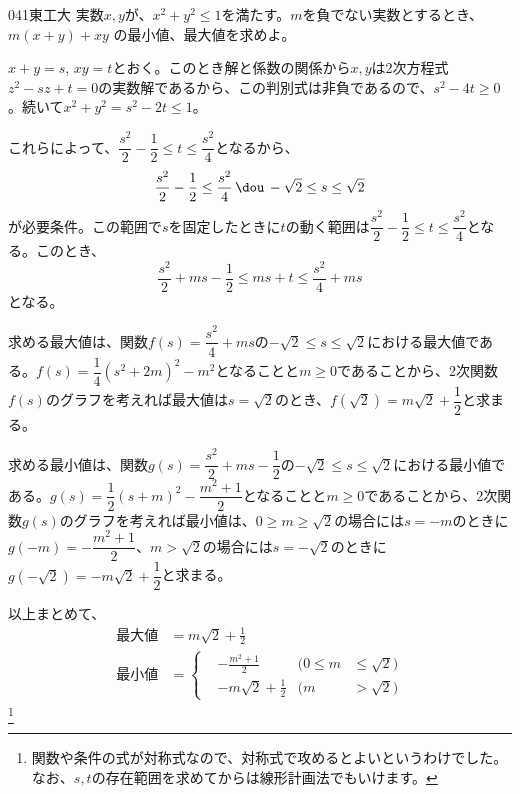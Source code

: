 \begin{thm}{041}{}{東工大}
 実数$x,y$が、$x^2+y^2\le 1$を満たす。$m$を負でない実数とするとき、$m(x+y)+xy$ の最小値、最大値を求めよ。
\end{thm}

$x+y=s$, $xy=t$とおく。このとき解と係数の関係から$x, y$は2次方程式$z^2-sz+t=0$の実数解であるから、この判別式は非負であるので、$s^2-4t\ge 0$。続いて$x^2+y^2=s^2-2t\le 1$。

これらによって、$\dfrac{s^2}{2}-\dfrac{1}{2}\le t\le \dfrac{s^2}{4}$となるから、
\[ \frac{s^2}{2}-\frac{1}{2}\le \frac{s^2}{4} \,\dou\, -\sqrt{2}\le s\le \sqrt{2} \]
が必要条件。この範囲で$s$を固定したときに$t$の動く範囲は$\dfrac{s^2}{2}-\dfrac{1}{2}\le t\le \dfrac{s^2}{4}$となる。このとき、
\[ \frac{s^2}{2}+ms-\frac{1}{2}\le ms+t\le \frac{s^2}{4}+ms \]
となる。

求める最大値は、関数$f(s)=\dfrac{s^2}{4}+ms$の$-\sqrt{2}\le s\le\sqrt{2}$における最大値である。$f(s)=\dfrac{1}{4}(s^2+2m)^2-m^2$となることと$m\ge 0$であることから、2次関数$f(s)$のグラフを考えれば最大値は$s=\sqrt{2}$のとき、$f(\sqrt{2})=m\sqrt{2}+\dfrac{1}{2}$と求まる。

求める最小値は、関数$g(s)=\dfrac{s^2}{2}+ms-\dfrac{1}{2}$の$-\sqrt{2}\le s\le \sqrt{2}$における最小値である。$g(s)=\dfrac{1}{2}(s+m)^2-\dfrac{m^2+1}{2}$となることと$m\ge 0$であることから、2次関数$g(s)$のグラフを考えれば最小値は、$0\ge m\ge\sqrt{2}$の場合には$s=-m$のときに$g(-m)=-\dfrac{m^2+1}{2}$、$m>\sqrt{2}$の場合には$s=-\sqrt{2}$のときに$g(-\sqrt{2})=-m\sqrt{2}+\dfrac{1}{2}$と求まる。

以上まとめて、
\begin{align*}
 \text{最大値}&=m\sqrt{2}+\frac{1}{2} \\
 \text{最小値}&=\left\{
 \begin{aligned}
  &-\frac{m^2+1}{2}  & (0\le m&\le\sqrt{2}) \\
  &-m\sqrt{2}+\frac{1}{2} & (m&>\sqrt{2})
 \end{aligned} \right.
\end{align*}
\footnote{関数や条件の式が対称式なので、対称式で攻めるとよいというわけでした。なお、$s, t$の存在範囲を求めてからは線形計画法でもいけます。}